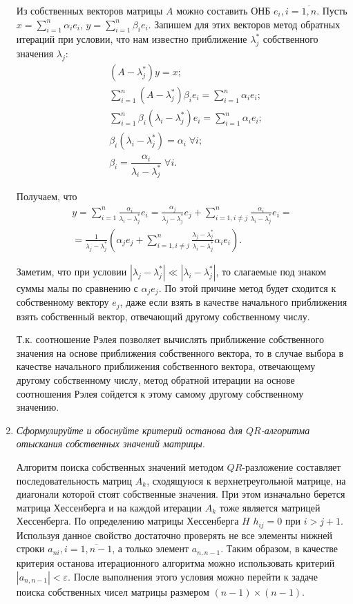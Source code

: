 \documentclass[12pt, a4paper]{article}
\begin{document}
\begin{enumerate}
		Из собственных векторов матрицы $A$ можно составить ОНБ $e_i, i = \overline{1, n}$. Пусть $x = \sum_{i=1}^n \alpha_i e_i$, $y = \sum_{i=1}^n \beta_i e_i$. Запишем для этих векторов метод обратных итераций при условии, что нам известно приближение $\lambda_j^*$ собственного значения $\lambda_j$:
		\begin{eqnarray*}
			& (A-\lambda_j^*) y = x;\\
			& \sum_{i=1}^n (A-\lambda_j^*) \beta_i e_i = \sum_{i=1}^n \alpha_i e_i;\\
			& \sum_{i=1}^n \beta_i (\lambda_i - \lambda_j^*) e_i = \sum_{i=1}^n \alpha_i e_i; \\
			& \beta_i (\lambda_i - \lambda_j^*) = \alpha_i \; \forall i; \\
			& \beta_i = \dfrac{\alpha_i}{\lambda_i - \lambda_j^*} \; \forall i.
		\end{eqnarray*}
		
		Получаем, что
		\begin{multline*}
			y = \sum_{i=1}^n \frac{\alpha_i}{\lambda_i - \lambda_j^*} e_i = \frac{\alpha_j}{\lambda_j - \lambda_j^*} e_j + \sum_{i=1, i \neq j}^n \frac{\alpha_i}{\lambda_i - \lambda_j^*} e_i = \\ = \frac1{\lambda_j - \lambda_j^*} \left(\alpha_j e_j + \sum_{i=1, i \neq j}^n \frac{\lambda_j - \lambda_j^*}{\lambda_i - \lambda_j^*} \alpha_i e_i\right).
		\end{multline*}
		
		Заметим, что при условии $|\lambda_j - \lambda_j^*| \ll |\lambda_i - \lambda_j^*|$, то слагаемые под знаком суммы малы по сравнению с $\alpha_j e_j$. По этой причине метод будет сходится к собственному вектору $e_j$, даже если взять в качестве начального приближения взять собственный вектор, отвечающий другому собственному числу.
		
		Т.к. соотношение Рэлея позволяет вычислять приближение собственного значения на основе приближения собственного вектора, то в случае выбора в качестве начального приближения собственного вектора, отвечающему другому собственному числу, метод обратной итерации на основе соотношения Рэлея сойдется к этому самому другому собственному значению.
		
		\smallskip
		
		\item \textit{Сформулируйте и обоснуйте критерий останова для $QR$-алгоритма отыскания собственных значений матрицы.}
		
		Алгоритм поиска собственных значений методом $QR$-разложение составляет последовательность матриц $A_k$, сходящуюся к верхнетреугольной матрице, на диагонали которой стоят собственные значения. При этом изначально берется матрица Хессенберга и на каждой итерации $A_k$ тоже является матрицей Хессенберга. По определению матрицы Хессенберга $H$ $h_{ij} = 0$ при $i > j+1$. Используя данное свойство достаточно проверять не все элементы нижней строки $a_{ni}, i = \overline{1, n-1}$, а только элемент $a_{n,n-1}$. Таким образом, в качестве критерия останова итерационного алгоритма можно использовать критерий $|a_{n, n-1}| < \varepsilon$. После выполнения этого условия можно перейти к задаче поиска собственных чисел матрицы размером $(n-1)\times (n-1)$.
		

\end{enumerate}
\end{document}
